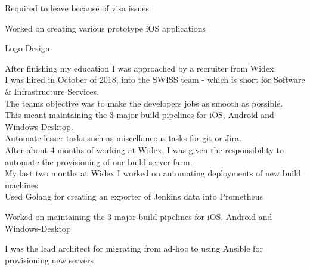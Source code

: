 \documentclass[]{cv}
\begin{document}
\begin{minipage}[t]{0.66\textwidth}
\vspace{\topsep} %
\begin{tightemize}
	\item Required to leave because of visa issues
	\item Worked on creating various prototype iOS applications
	\item Logo Design
\end{tightemize}
\sectionsep


After finishing my education I was approached by a recruiter from Widex. \\
I was hired in October of 2018, into the SWISS team - which is short for Software \& Infrastructure Services. \\
The teams objective was to make the developers jobs as smooth as possible. \\
This meant maintaining the 3 major build pipelines for iOS, Android and Windows-Desktop. \\
Automate lesser tasks such as miscellaneous tasks for git or Jira. \\
After about 4 months of working at Widex, I was given the responsibility to automate the provisioning of our build server farm. \\
My last two months at Widex I worked on automating deployments of new build machines \\
Used Golang for creating an exporter of Jenkins data into Prometheus

\begin{tightemize}
	\item Worked on maintaining the 3 major build pipelines for iOS, Android and	Windows-Desktop
	\item I was the lead architect for migrating from ad-hoc to using Ansible for provisioning new servers
\end{tightemize}
\sectionsep



\end{minipage}
\end{document}
